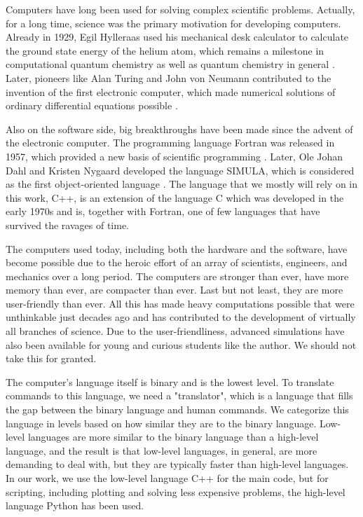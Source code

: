 Computers have long been used for solving complex scientific problems. Actually, for a long time, science was the primary motivation for developing computers. Already in 1929, Egil Hylleraas used his mechanical desk calculator to calculate the ground state energy of the helium atom, which remains a milestone in computational quantum chemistry as well as quantum chemistry in general \supercite{helgaker_perspective_2000}. Later, pioneers like Alan Turing and John von Neumann contributed to the invention of the first electronic computer, which made numerical solutions of ordinary differential equations possible \supercite{gustafsson_scientific_2018}. 

Also on the software side, big breakthroughs have been made since the advent of the electronic computer. The programming language Fortran was released in 1957, which provided a new basis of scientific programming \supercite{allen_history_1981}. Later, Ole Johan Dahl and Kristen Nygaard developed the language SIMULA, which is considered as the first object-oriented language \supercite{holmevik_compiling_1994}. The language that we mostly will rely on in this work, C++, is an extension of the language C which was developed in the early 1970s and is, together with Fortran, one of few languages that have survived the ravages of time. 

The computers used today, including both the hardware and the software, have become possible due to the heroic effort of an array of scientists, engineers, and mechanics over a long period. The computers are stronger than ever, have more memory than ever, are compacter than ever. Last but not least, they are more user-friendly than ever. All this has made heavy computations possible that were unthinkable just decades ago and has contributed to the development of virtually all branches of science. Due to the user-friendliness, advanced simulations have also been available for young and curious students like the author. We should not take this for granted. 

The computer's language itself is binary and is the lowest level. To translate commands to this language, we need a "translator", which is a language that fills the gap between the binary language and human commands. We categorize this language in levels based on how similar they are to the binary language. Low-level languages are more similar to the binary language than a high-level language, and the result is that low-level languages, in general, are more demanding to deal with, but they are typically faster than high-level languages. In our work, we use the low-level language C++ for the main code, but for scripting, including plotting and solving less expensive problems, the high-level language Python has been used. 

